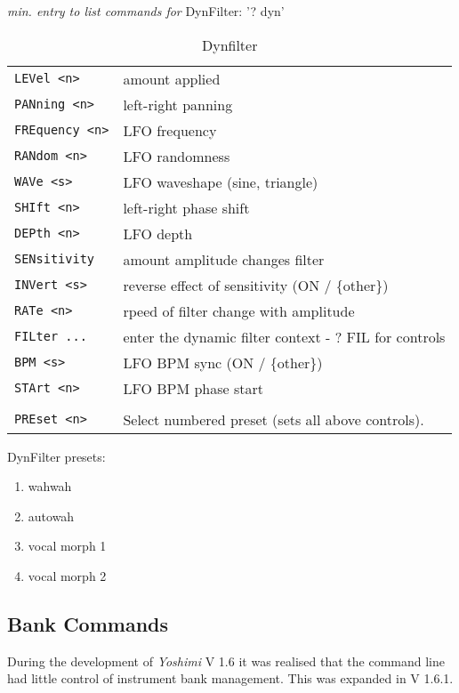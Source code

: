 \pagebreak
   \textsl{min. entry to list commands for} DynFilter:  '? dyn'
   \begin{table}[H]
      \centering
      \caption{Dynfilter}
      \begin{tabular}{l l}
\texttt{LEVel <n>} &
   amount applied \\
\texttt{PANning <n>} &
   left-right panning \\
\texttt{FREquency <n>} &
   LFO frequency \\
\texttt{RANdom <n>} &
   LFO randomness \\
\texttt{WAVe <s>} &
   LFO waveshape (sine, triangle) \\
\texttt{SHIft <n>} &
   left-right phase shift \\
\texttt{DEPth <n>} &
   LFO depth \\
\texttt{SENsitivity} &
   amount amplitude changes filter \\
\texttt{INVert <s>} &
   reverse effect of sensitivity (ON / \{other\}) \\
\texttt{RATe <n>} &
   rpeed of filter change with amplitude \\
\texttt{FILter ...} &
   enter the dynamic filter context - ? FIL for controls\\
\texttt{BPM <s>} &
   LFO BPM sync (ON / \{other\}) \\
\texttt{STArt <n>} &
   LFO BPM phase start \\
\texttt{} & \\ %
\texttt{PREset <n>} &
   Select numbered preset (sets all above controls). \\
      \end{tabular}
   \end{table}
DynFilter presets:
   \begin{enumerate}
   \item wahwah
   \item autowah
   \item vocal morph 1
   \item vocal morph 2
   \end{enumerate}

\subsection{Bank Commands}
\label{subsec:command_line_bank_command_list}

   During the development of \textsl{Yoshimi} V 1.6 it was realised that
   the command line had little control of instrument bank management.
   This was expanded in V 1.6.1.


